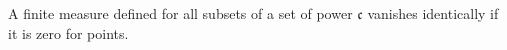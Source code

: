 A finite measure defined for all subsets of a set of power $\mathfrak{c}$ vanishes identically if it is zero for points.
